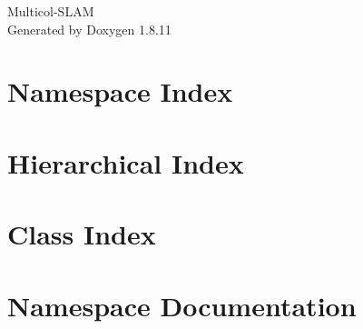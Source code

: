 \documentclass[twoside]{book}
\newcommand{\+}{\discretionary{\mbox{\scriptsize$\hookleftarrow$}}{}{}}
\newcommand{\clearemptydoublepage}{%
  \newpage{\pagestyle{empty}\cleardoublepage}%
}
\begin{document}
\hypersetup{pageanchor=false,
             bookmarksnumbered=true,
             pdfencoding=unicode
            }
\begin{titlepage}
\vspace*{7cm}
\begin{center}%
{\Large Multicol-\/\+S\+L\+AM }\\
\vspace*{1cm}
{\large Generated by Doxygen 1.8.11}\\
\end{center}
\end{titlepage}
\clearemptydoublepage
\tableofcontents
\clearemptydoublepage
{}
\hypersetup{pageanchor=true}

\chapter{Namespace Index}

\chapter{Hierarchical Index}

\chapter{Class Index}

\chapter{Namespace Documentation}

\end{document}
